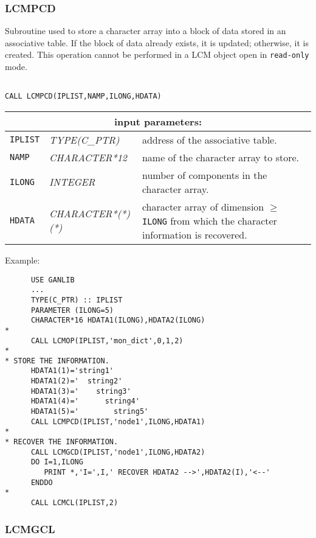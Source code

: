 \subsubsection{LCMPCD}\label{sect:LCMPCD}

Subroutine used to store a character array into a block of data stored in an associative table.
If the block of data already exists, it is updated; otherwise, it is created. This operation cannot be performed
in a LCM object open in {\tt read-only} mode.

\begin{verbatim}

CALL LCMPCD(IPLIST,NAMP,ILONG,HDATA)
\end{verbatim}

\noindent
\begin{tabular}{|p{1.5cm}|p{3.5cm}|p{9.5cm}|}
\hline
\multicolumn{3}{|c|}{\bf input parameters:} \\
\hline
{\tt IPLIST} & {\it TYPE(C\_PTR)} & address of the associative table. \\
\hline
{\tt NAMP} & {\it CHARACTER*12} & name of the character array
to store. \\
\hline
{\tt ILONG} & {\it INTEGER} & number of components in the character array.\\
\hline
{\tt HDATA} & {\it CHARACTER*(*)(*)} & character array of dimension $\ge$ {\tt ILONG} from which the character information is recovered. \\
\hline
\end{tabular}

\vskip 0.4cm

\noindent Example:
\begin{verbatim}
      USE GANLIB
      ...
      TYPE(C_PTR) :: IPLIST
      PARAMETER (ILONG=5)
      CHARACTER*16 HDATA1(ILONG),HDATA2(ILONG)
*
      CALL LCMOP(IPLIST,'mon_dict',0,1,2)
*
* STORE THE INFORMATION.
      HDATA1(1)='string1'
      HDATA1(2)='  string2'
      HDATA1(3)='    string3'
      HDATA1(4)='      string4'
      HDATA1(5)='        string5'
      CALL LCMPCD(IPLIST,'node1',ILONG,HDATA1)
*
* RECOVER THE INFORMATION.
      CALL LCMGCD(IPLIST,'node1',ILONG,HDATA2)
      DO I=1,ILONG
         PRINT *,'I=',I,' RECOVER HDATA2 -->',HDATA2(I),'<--'
      ENDDO
*
      CALL LCMCL(IPLIST,2)
\end{verbatim}

\subsubsection{LCMGCL}\label{sect:LCMGCL}

